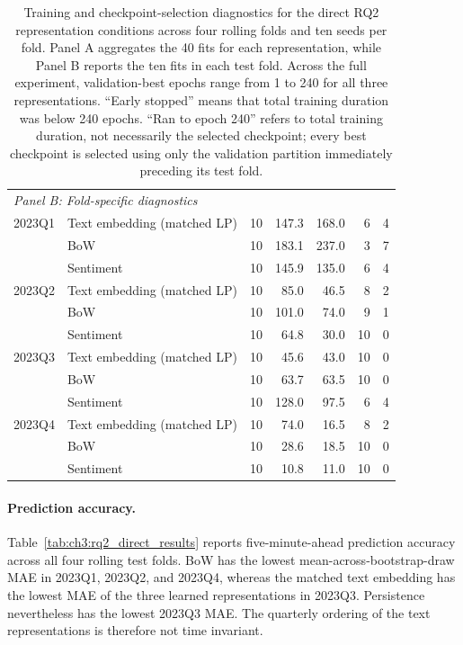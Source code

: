 \begin{table}[htbp]
\begin{tabular}{@{}llrrrrr@{}}
\multicolumn{7}{l}{\textit{Panel B: Fold-specific diagnostics}} \\
2023Q1 & Text embedding (matched LP) & 10 & 147.3 & 168.0 &  6 & 4 \\
       & BoW                         & 10 & 183.1 & 237.0 &  3 & 7 \\
       & Sentiment                   & 10 & 145.9 & 135.0 &  6 & 4 \\
\addlinespace[0.2em]
2023Q2 & Text embedding (matched LP) & 10 &  85.0 &  46.5 &  8 & 2 \\
       & BoW                         & 10 & 101.0 &  74.0 &  9 & 1 \\
       & Sentiment                   & 10 &  64.8 &  30.0 & 10 & 0 \\
\addlinespace[0.2em]
2023Q3 & Text embedding (matched LP) & 10 &  45.6 &  43.0 & 10 & 0 \\
       & BoW                         & 10 &  63.7 &  63.5 & 10 & 0 \\
       & Sentiment                   & 10 & 128.0 &  97.5 &  6 & 4 \\
\addlinespace[0.2em]
2023Q4 & Text embedding (matched LP) & 10 &  74.0 &  16.5 &  8 & 2 \\
       & BoW                         & 10 &  28.6 &  18.5 & 10 & 0 \\
       & Sentiment                   & 10 &  10.8 &  11.0 & 10 & 0 \\
\bottomrule
\end{tabular}
\caption[Training diagnostics for direct RQ2 representation conditions]{Training and checkpoint-selection diagnostics for the direct RQ2
representation conditions across four rolling folds and ten seeds per fold. Panel A
aggregates the 40 fits for each representation, while Panel B reports the ten
fits in each test fold. Across the full experiment, validation-best epochs
range from 1 to 240 for all three representations. ``Early stopped'' means
that total training duration was below 240 epochs. ``Ran to epoch 240'' refers
to total training duration, not necessarily the selected checkpoint; every
best checkpoint is selected using only the validation partition immediately
preceding its test fold.}
\label{tab:ch3:rq2_training_diagnostics}
\end{table}

\paragraph*{Prediction accuracy.}
Table~\ref{tab:ch3:rq2_direct_results} reports five-minute-ahead prediction
accuracy across all four rolling test folds. BoW has the lowest
mean-across-bootstrap-draw MAE in 2023Q1, 2023Q2, and 2023Q4, whereas the matched text
embedding has the lowest MAE of the three learned representations in 2023Q3.
Persistence nevertheless has the lowest 2023Q3 MAE. The quarterly ordering
of the text representations is therefore not time invariant.

